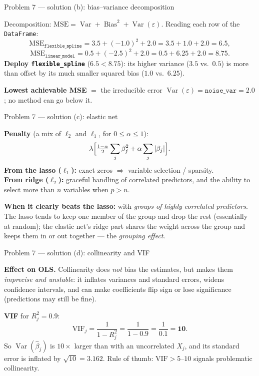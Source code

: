 \documentclass[aspectratio=169,11pt]{beamer}
\begin{document}
\begin{frame}{Problem 7 --- solution (b): bias--variance decomposition}
  \begin{solutionbox}
    Decomposition: $\text{MSE}=\operatorname{Var}+\operatorname{Bias}^2+\operatorname{Var}(\varepsilon)$.
    Reading each row of the \texttt{DataFrame}:
    \[
      \text{MSE}_{\texttt{flexible\_spline}}=3.5+(-1.0)^2+2.0=3.5+1.0+2.0=\mathbf{6.5},
    \]
    \[
      \text{MSE}_{\texttt{linear\_model}}=0.5+(-2.5)^2+2.0=0.5+6.25+2.0=\mathbf{8.75}.
    \]
    \textbf{Deploy \texttt{flexible\_spline}} ($6.5<8.75$): its higher variance ($3.5$ vs.\ $0.5$)
    is more than offset by its much smaller squared bias ($1.0$ vs.\ $6.25$).
    \medskip

    \textbf{Lowest achievable MSE} $=$ the irreducible error
    $\operatorname{Var}(\varepsilon)=\texttt{noise\_var}=\mathbf{2.0}$; no method can go below it.
  \end{solutionbox}
\end{frame}

\begin{frame}{Problem 7 --- solution (c): elastic net}
  \begin{solutionbox}
    \textbf{Penalty} (a mix of $\ell_2$ and $\ell_1$, for $0\le\alpha\le1$):
    \[
      \lambda\Bigl[\tfrac{1-\alpha}{2}\sum_j\beta_j^2+\alpha\sum_j|\beta_j|\Bigr].
    \]
    \textbf{From the lasso ($\ell_1$):} exact zeros $\Rightarrow$ variable selection / sparsity.\\
    \textbf{From ridge ($\ell_2$):} graceful handling of correlated predictors, and the ability to
    select more than $n$ variables when $p>n$.
    \medskip

    \textbf{When it clearly beats the lasso:} with \emph{groups of highly correlated predictors}.
    The lasso tends to keep one member of the group and drop the rest (essentially at random); the
    elastic net's ridge part shares the weight across the group and keeps them in or out together
    --- the \emph{grouping effect}.
  \end{solutionbox}
\end{frame}

\begin{frame}{Problem 7 --- solution (d): collinearity and VIF}
  \begin{solutionbox}
    \textbf{Effect on OLS.} Collinearity does \emph{not} bias the estimates, but makes them
    \emph{imprecise and unstable}: it inflates variances and standard errors, widens confidence
    intervals, and can make coefficients flip sign or lose significance (predictions may still be
    fine).
    \medskip

    \textbf{VIF} for $R_j^2=0.9$:
    \[
      \mathrm{VIF}_j=\frac{1}{1-R_j^2}=\frac{1}{1-0.9}=\frac{1}{0.1}=\mathbf{10}.
    \]
    So $\operatorname{Var}(\hat\beta_j)$ is $10\times$ larger than with an uncorrelated $X_j$, and
    its standard error is inflated by $\sqrt{10}=\mathbf{3.162}$. Rule of thumb:
    $\mathrm{VIF}>5$--$10$ signals problematic collinearity.
  \end{solutionbox}
\end{frame}
\end{document}
